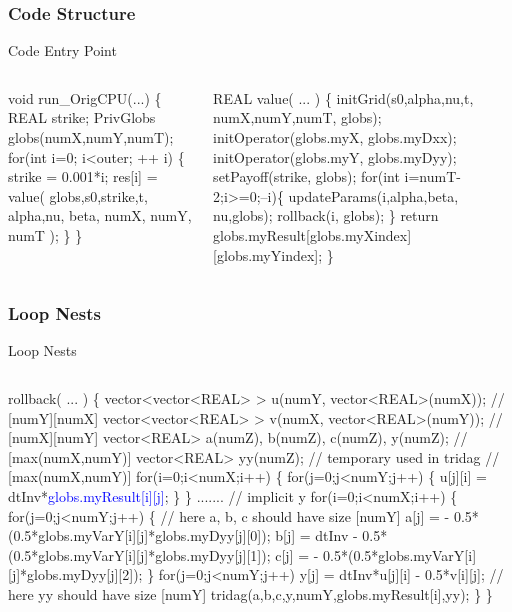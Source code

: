 \documentclass{beamer}
\newcommand{\blue}[1]{\textcolor{Blue}{{#1}}}
\renewcommand{\emph}[1]{\textcolor{structure}{#1}}
\newcommand{\emp}[1]{\textcolor{DikuRed}{ #1}}
\begin{document}
\begin{frame}[fragile,t]
  \frametitle{Code Structure} %

\begin{block}{Code Entry Point}
\begin{columns}
\begin{colorcode}
void   run_OrigCPU(...) \{
  REAL strike;
  PrivGlobs globs(numX,numY,numT);
  \emph{for(int i=0; i<outer; ++ i)} \{
    strike = 0.001*i;
    res[i] = \emp{value}( globs,s0,strike,t,
                    alpha,nu,   beta,
                    numX, numY, numT );
  \}
\}
\end{colorcode}
\begin{colorcode}
REAL   \emp{value}( ... ) \{
  initGrid(s0,alpha,nu,t, 
           numX,numY,numT, 
           globs);
  initOperator(globs.myX,
               globs.myDxx);
  initOperator(globs.myY,
               globs.myDyy);
  setPayoff(strike, globs);
  \alert{for(int i=numT-2;i>=0;--i)}\{
    updateParams(i,alpha,beta,
                 nu,globs);
    rollback(i, globs);
  \}
  return globs.myResult[globs.myXindex]
                       [globs.myYindex];
\}
\end{colorcode}
\end{columns}
\end{block} 

\end{frame}


\begin{frame}[fragile,t]
  \frametitle{Loop Nests} %

\begin{block}{Loop Nests}
\begin{columns}
\begin{colorcode}
rollback( ... ) \{
  vector<vector<REAL> > u(numY, vector<REAL>(numX));   // [numY][numX]
  vector<vector<REAL> > v(numX, vector<REAL>(numY));   // [numX][numY]
  vector<REAL> a(numZ), b(numZ), c(numZ), y(numZ);     // [max(numX,numY)] 
  vector<REAL> yy(numZ);  // temporary used in tridag  // [max(numX,numY)]
  for(i=0;i<numX;i++) \{
    for(j=0;j<numY;j++) \{
      u[j][i] = dtInv*\blue{globs.\alert{myResult[i][j]}};
  \} \}  .......
  // implicit y
  for(i=0;i<numX;i++) \{ 
    for(j=0;j<numY;j++) \{  // here a, b, c should have size [numY]
      a[j] =		 - 0.5*(0.5*globs.myVarY[i][j]*globs.myDyy[j][0]);
      b[j] = dtInv - 0.5*(0.5*globs.myVarY[i][j]*globs.myDyy[j][1]);
      c[j] =		 - 0.5*(0.5*globs.myVarY[i][j]*globs.myDyy[j][2]);
    \}
    for(j=0;j<numY;j++)
      y[j] = dtInv*u[j][i] - 0.5*v[i][j];
    // here yy should have size [numY]
    tridag(a,b,c,y,numY,globs.\alert{myResult[i]},yy);
  \} \}
\end{colorcode}
\end{columns}
\end{block} 

\end{frame}
\end{document}
